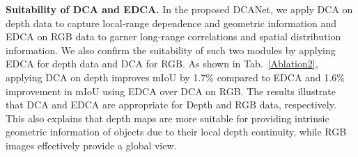 \documentclass[10pt,twocolumn,letterpaper]{article}
\begin{document}
\begin{table}[]
   \centering
   \caption{Suitability of DCA and EDCA of the NYUDv2 test set. Note: Our proposed method applies DCA for Depth and EDCA for RGB data.}
   \label{Ablation2}
\end{table}


\textbf{Suitability of DCA and EDCA.}
In the proposed DCANet, we apply DCA on depth data to capture local-range dependence and geometric information and EDCA on
RGB data to garner long-range correlations and spatial distribution information.
We also confirm the suitability of such two modules by applying EDCA for depth data and DCA for RGB. As shown in Tab.~\ref{Ablation2},
applying DCA on depth improves mIoU by 1.7\% compared to EDCA and 1.6\% improvement in mIoU using EDCA over DCA on RGB.
The results illustrate that DCA and EDCA are appropriate for Depth and RGB data, respectively. This also explains that depth
maps are more suitable for providing intrinsic geometric information of objects due to their local depth continuity, while RGB
images effectively provide a global view.
\end{document}

